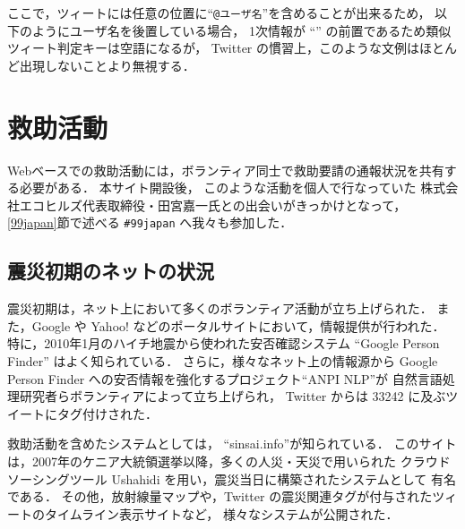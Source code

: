 \documentclass[japanese]{jnlp_1.4}
\newcommand{\twitter}[3]{}
\begin{document}
ここで，ツィートには任意の位置に``{\tt @ユーザ名}''を含めることが出来るため，
以下のようにユーザ名を後置している場合，
1次情報が ``{\tt@}'' の前置であるため類似ツィート判定キーは空語になるが，
Twitter の慣習上，このような文例はほとんど出現しないことより無視する．
\begin{quote}
  \twitter{1次情報 $\ldots$ @user2}{YYYY/MM/DD hh:mm:ss}{user1}
\end{quote}
  


\section{救助活動}

Webベースでの救助活動には，ボランティア同士で救助要請の通報状況を共有する必要がある．
本サイト開設後，
このような活動を個人で行なっていた
株式会社エコヒルズ代表取締役・田宮嘉一氏との出会いがきっかけとなって，
\ref{99japan}節で述べる {\tt \#99japan} へ我々も参加した．


\subsection{震災初期のネットの状況}

震災初期は，ネット上において多くのボランティア活動が立ち上げられた．
また，Google や Yahoo! などのポータルサイトにおいて，情報提供が行われた．
特に，2010年1月のハイチ地震から使われた安否確認システム ``Google Person Finder'' はよく知られている\cite{GPF}．
さらに，様々なネット上の情報源から Google Person Finder への安否情報を強化するプロジェクト``ANPI NLP''が
自然言語処理研究者らボランティアによって立ち上げられ，
Twitter からは 33242 に及ぶツイートにタグ付けされた\cite{anpi_nlp_proc}．

救助活動を含めたシステムとしては，
``sinsai.info''が知られている．
このサイトは，2007年のケニア大統領選挙以降，多くの人災・天災で用いられた
クラウドソーシングツール Ushahidi を用い，震災当日に構築されたシステムとして
有名である\cite{sinsai.info_TechWave}．
その他，放射線量マップや，Twitter の震災関連タグが付与されたツィートのタイムライン表示サイトなど，
様々なシステムが公開された．
\end{document}
